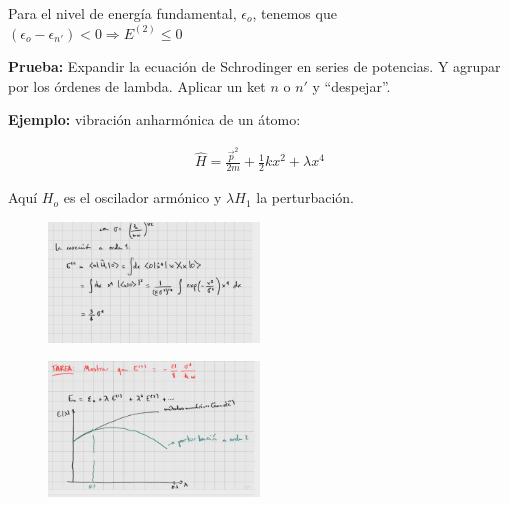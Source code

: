 Para el nivel de energía fundamental, $\epsilon_o$, tenemos que $(\epsilon_o-\epsilon_{n'})<0\Rightarrow E^{(2)}\leq 0$

\textbf{Prueba:} Expandir la ecuación de Schrodinger en series de potencias. Y agrupar por los órdenes de lambda. Aplicar un ket $n$ o $n'$ y ``despejar''.

\textbf{Ejemplo:} vibración anharmónica de un átomo:

\begin{align*}
    \hat{H}=\frac{\vec{p}^2}{2m}+\frac{1}{2}kx^2+\lambda x^4
\end{align*}

Aquí $H_o$ es el oscilador armónico y $\lambda H_1$ la perturbación.

\begin{figure}[H]
    \centering
    \includegraphics[width=0.5\textwidth]{Graficas/Aug23-1.png}
\end{figure}

\begin{figure}[H]
    \centering
    \includegraphics[width=0.5\textwidth]{Graficas/Aug23-2.png}
\end{figure}